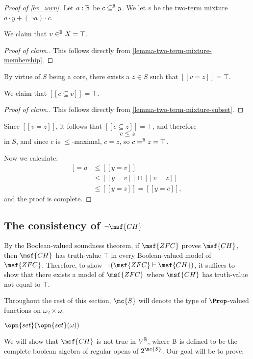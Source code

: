 \documentclass[11pt]{article}
\newcommand{\ZFC}{\msf{ZFC}}
\newcommand{\CH}{\msf{CH}}
\begin{document}
\begin{proof}[Proof of \ref{bv_zorn}]
Let $a : \mathbb{B}$ be $c \subseteq^{\mathbb{B}} y$. We let $v$ be the two-term mixture $a \cdot y + (\neg a) \cdot c$.

We claim that $v \in^{\mathbb{B}} X = \top$.
\begin{proof}[Proof of claim.]
This follows directly from \ref{lemma-two-term-mixture-membership}.
\end{proof}

By virtue of $S$ being a core, there exists a $z \in S$ such that $[[v = z]] = \top$.

We claim that $[[c \subseteq v]] = \top$.
\begin{proof}[Proof of claim.]
This follows directly from \ref{lemma-two-term-mixture-subset}.
\end{proof}

Since $[[v = z]]$, it follows that $[[c \subseteq z]] = \top$, and therefore
$$
c \leq z
$$
in $S$, and since $c$ is $\leq$-maximal, $c = z$, so $c =^{\mathbb{B}} z = \top$.

Now we calculate:
\begin{align*}
  [[c \subseteq y]] = a &\leq [[y = v]]\\
                        &\leq [[y = v]] \sqcap [[v = z]]\\
                        &\leq [[y = z]] = [[y = c]],
\end{align*}
and the proof is complete.
\end{proof}

\subsection{The consistency of $\neg \CH$}
By the Boolean-valued soundness theorem, if $\ZFC$ proves $\msf{CH}$, then $\msf{CH}$ has truth-value $\top$ in every Boolean-valued model of $\ZFC$. Therefore, to show $\neg \left(\ZFC \vdash \CH\right)$, it suffices to show that there exists a model of $\ZFC$ where $\CH$ has truth-value not equal to $\top$.

Throughout the rest of this section, $\mc{S}$ will denote the type of $\Prop$-valued functions on $\omega_2 \times \omega$. %

 $\opn{set}(\opn{set}(\omega))$

We will show that $\CH$ is not true in $V^{\mathbb{B}}$, where $\mathbb{B}$ is defined to be the complete boolean algebra of regular opens of $2^{\mc{S}}$. Our goal will be to prove:
\end{document}
